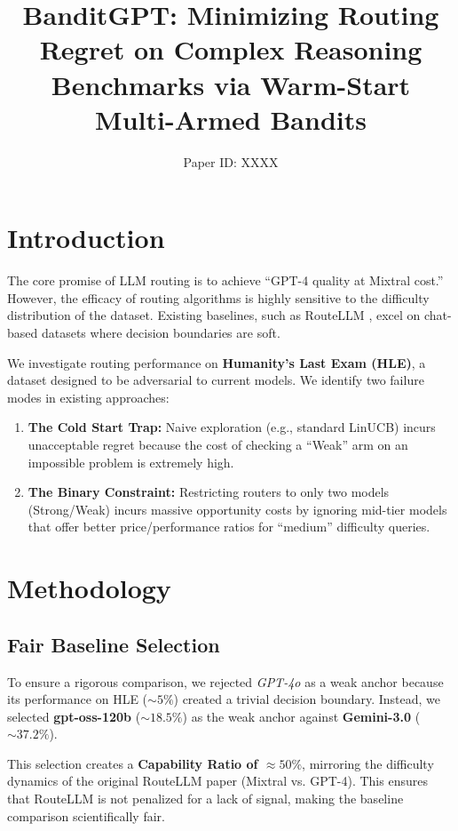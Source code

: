 \documentclass[sigconf]{acmart}
\title{BanditGPT: Minimizing Routing Regret on Complex Reasoning Benchmarks via Warm-Start Multi-Armed Bandits}
\author{Paper ID: XXXX}
\affiliation{%
  \institution{Confidential Submission}
}
\begin{document}
\maketitle

\section{Introduction}
The core promise of LLM routing is to achieve ``GPT-4 quality at Mixtral cost.'' However, the efficacy of routing algorithms is highly sensitive to the difficulty distribution of the dataset. Existing baselines, such as RouteLLM \cite{ong2024routellm}, excel on chat-based datasets where decision boundaries are soft.

We investigate routing performance on \textbf{Humanity's Last Exam (HLE)}, a dataset designed to be adversarial to current models. We identify two failure modes in existing approaches:
\begin{enumerate}
    \item \textbf{The Cold Start Trap:} Naive exploration (e.g., standard LinUCB) incurs unacceptable regret because the cost of checking a ``Weak'' arm on an impossible problem is extremely high.
    \item \textbf{The Binary Constraint:} Restricting routers to only two models (Strong/Weak) incurs massive opportunity costs by ignoring mid-tier models that offer better price/performance ratios for ``medium'' difficulty queries.
\end{enumerate}

\section{Methodology}

\subsection{Fair Baseline Selection}
To ensure a rigorous comparison, we rejected \textit{GPT-4o} as a weak anchor because its performance on HLE ($\sim 5\%$) created a trivial decision boundary. Instead, we selected \textbf{gpt-oss-120b} ($\sim 18.5\%$) as the weak anchor against \textbf{Gemini-3.0} ($\sim 37.2\%$).

This selection creates a \textbf{Capability Ratio of $\approx 50\%$}, mirroring the difficulty dynamics of the original RouteLLM paper (Mixtral vs. GPT-4). This ensures that RouteLLM is not penalized for a lack of signal, making the baseline comparison scientifically fair.
\end{document}
